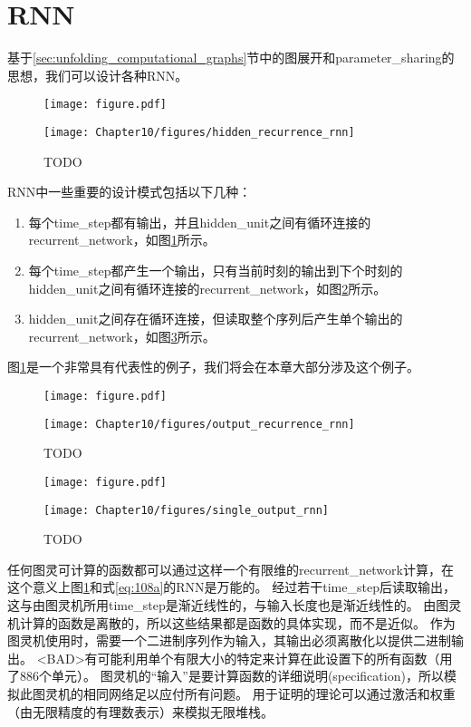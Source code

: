 \section{\gls{RNN}}
\label{sec:recurrent_neural_networks}
基于\ref{sec:unfolding_computational_graphs}节中的图展开和\gls{parameter_sharing}的思想，我们可以设计各种\gls{RNN}。
\begin{figure}[!htb]
\ifOpenSource
\centerline{\texttt{[image: figure.pdf]}}
\else
\centerline{\texttt{[image: Chapter10/figures/hidden\_recurrence\_rnn]}}
\fi
\caption{TODO}
\label{fig:chap10_hidden_recurrence_rnn}
\end{figure}
\gls{RNN}中一些重要的设计模式包括以下几种：
\begin{enumerate}
 \item 每个\gls{time_step}都有输出，并且\gls{hidden_unit}之间有循环连接的\gls{recurrent_network}，如图\ref{fig:chap10_hidden_recurrence_rnn}所示。
 \item 每个\gls{time_step}都产生一个输出，只有当前时刻的输出到下个时刻的\gls{hidden_unit}之间有循环连接的\gls{recurrent_network}，如图\ref{fig:chap10_output_recurrence_rnn}所示。
 \item \gls{hidden_unit}之间存在循环连接，但读取整个序列后产生单个输出的\gls{recurrent_network}，如图\ref{fig:chap10_single_output_rnn}所示。
\end{enumerate}
图\ref{fig:chap10_hidden_recurrence_rnn}是一个非常具有代表性的例子，我们将会在本章大部分涉及这个例子。
\begin{figure}[!htb]
\ifOpenSource
\centerline{\texttt{[image: figure.pdf]}}
\else
\centerline{\texttt{[image: Chapter10/figures/output\_recurrence\_rnn]}}
\fi
\caption{TODO}
\label{fig:chap10_output_recurrence_rnn}
\end{figure}

\begin{figure}[!htb]
\ifOpenSource
\centerline{\texttt{[image: figure.pdf]}}
\else
\centerline{\texttt{[image: Chapter10/figures/single\_output\_rnn]}}
\fi
\caption{TODO}
\label{fig:chap10_single_output_rnn}
\end{figure}

任何图灵可计算的函数都可以通过这样一个有限维的\gls{recurrent_network}计算，在这个意义上图\ref{fig:chap10_hidden_recurrence_rnn}和式\eqref{eq:108a}的\gls{RNN}是万能的。
经过若干\gls{time_step}后读取输出，这与由图灵机所用\gls{time_step}是渐近线性的，与输入长度也是渐近线性的\citep{Siegelmann+Sontag-1991,Siegelmann-1995,Siegelmann+Sontag-1995,Hyotyniemi-1996}。
由图灵机计算的函数是离散的，所以这些结果都是函数的具体实现，而不是近似。
作为图灵机使用时，需要一个二进制序列作为输入，其输出必须离散化以提供二进制输出。
<BAD>有可能利用单个有限大小的特定来计算在此设置下的所有函数（\cite{Siegelmann+Sontag-1995}用了886个单元）。
图灵机的``输入''是要计算函数的详细说明(specification)，所以模拟此图灵机的相同网络足以应付所有问题。
用于证明的理论可以通过激活和权重（由无限精度的有理数表示）来模拟无限堆栈。


